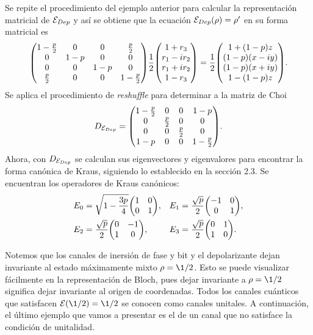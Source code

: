 Se repite el procedimiento del ejemplo anterior para calcular 
la representación matricial de $\mathcal{E}_{Dep}$ y así se obtiene
que la ecuación $\mathcal{E}_{Dep}(\rho)=\rho'$ en su forma matricial es
\begin{align}
\mqty(
1-\frac{p}{2} & 0 & 0 & \frac{p}{2} \\
0 & 1-p & 0 & 0 \\
0 & 0 & 1-p & 0 \\
\frac{p}{2} & 0 & 0 & 1-\frac{p}{2}
)
\frac{1}{2}
\mqty(
1+r_3\\r_1-ir_2\\r_1+ir_2\\1-r_3
)
=
\frac{1}{2}
\mqty(
1+\qty(1-p)z\\
\qty(1-p)\qty(x-i y)\\
\qty(1-p)\qty(x+i y)\\
1-\qty(1-p)z
).
\end{align}
Se aplica el procedimiento de \textit{reshuffle}
para determinar a la matriz de Choi
\begin{align}
D_{\E_{Dep}}=
\mqty(
 1-\frac{p}{2} & 0 & 0 & 1-p \\
 0 & \frac{p}{2} & 0 & 0 \\
 0 & 0 & \frac{p}{2} & 0 \\
 1-p & 0 & 0 & 1-\frac{p}{2} 
).
\label{•}
\end{align}
Ahora, con $D_{\mathcal{E}_{Dep}}$ se calculan sus 
eigenvectores y eigenvalores para encontrar la forma 
canónica de Kraus, siguiendo lo establecido en la
sección 2.3. Se encuentran los operadores de Kraus
canónicos:
\begin{align}
E_0&=
\sqrt{1-\frac{3p}{4}}
\mqty(
1 & 0\\
0 & 1
),&
E_1&=
\frac{\sqrt{p}}{2}
\mqty(
-1 & 0\\
0 & 1
),\\
E_2&=
\frac{\sqrt{p}}{2}
\mqty(
0 & -1\\
1 & 0
), &
E_3&=
\frac{\sqrt{p}}{2}
\mqty(
0 & 1\\
1 & 0
).
\end{align}

Notemos que los canales de inersión de fase y bit y el
depolarizante dejan invariante al estado máximamente mixto
$\rho=\1/2$. Esto se puede visualizar fácilmente en la representación
de Bloch, pues dejar invariante a $\rho=\1/2$ significa dejar 
invariante al origen de coordenadas. Todos los canales 
cuánticos que satisfacen $\E(\1/2)=\1/2$
se conocen como canales unitales. 
A continuación, el último ejemplo que vamos a presentar
es el de un canal que no satisface la condición de unitalidad.

